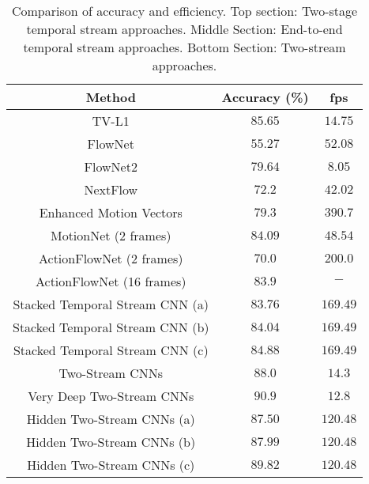 \documentclass[runningheads]{llncs}
\begin{document}
		\begin{table}[t]
			\begin{center}\caption{Comparison of accuracy and efficiency.
					Top section: Two-stage temporal stream approaches.  
					Middle Section: End-to-end temporal stream approaches.  
					Bottom Section: Two-stream approaches. \label{tab:unsup_results}}
\begin{tabular}{  c | c | c  }
						\hline
						Method										&    Accuracy (\%)  &    fps \\
						\hline		
						\hline
						TV-L1 \cite{TVL1realTime}							&   $85.65$   &    $14.75$ \\		
						FlowNet \cite{flownet}							&   $55.27$   &    $52.08$ \\		
						FlowNet2 \cite{flownet2}					&   $79.64$   &    $8.05$ \\
						NextFlow \cite{nextflow_16}					&   $72.2$   &    $42.02$ \\
						Enhanced Motion Vectors \cite{EMV_cvpr16}			&   $79.3$   &    $390.7$ \\	
						MotionNet (2 frames)				&   $84.09$   &    $48.54$ \\		
						\hline
						\hline
						ActionFlowNet (2 frames)\cite{actionflownet_16}			&   $70.0$ 	&    $200.0$\\	ActionFlowNet (16 frames)\cite{actionflownet_16}		&   $83.9$ 	&    $-$\\	Stacked Temporal Stream CNN (a)	    					&   $83.76$ 	&    $169.49$\\	Stacked Temporal Stream CNN (b)     					&   $84.04$ 	&    $169.49$\\	
						Stacked Temporal Stream CNN (c)    					&   $84.88$ 	&    $169.49$\\	\hline
						\hline
Two-Stream CNNs \cite{twostream2014}				&   $88.0$ 	&    $14.3$\\	Very Deep Two-Stream CNNs\cite{wanggoodpractice2015}				&   $\mathbf{90.9}$ 	&    $\mathbf{12.8}$\\	Hidden Two-Stream CNNs (a)    					&   $87.50$ 	&    $120.48$\\	Hidden Two-Stream CNNs (b)    					&   $87.99$ 	&    $120.48$\\	Hidden Two-Stream CNNs (c)    					&   $\mathbf{89.82}$ 	&    $\mathbf{120.48}$\\	\hline
					\end{tabular}
\end{center}
		\end{table} 
		
\end{document}

